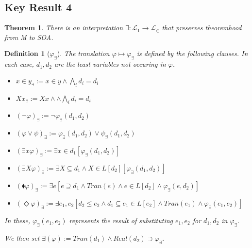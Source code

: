 \documentclass{article}
\newcommand\D{\blacklozenge}
\newtheorem{definition}{Definition}
\newtheorem{theorem}{Theorem}
\begin{document}
\subsection{Key Result 4}
\begin{theorem} 
    There is an interpretation $\exists : \mathcal{L}_1 \to \mathcal{L}_\in$ that preserves 
    theoremhood from M to SOA.
    \end{theorem}
    \begin{definition}[$\varphi_\exists$]
        The translation $\varphi \mapsto \varphi_\exists$ is defined by the following clauses.
        In each case, $d_1, d_2$ are the least variables not occuring in $\varphi$.
        \begin{itemize}
            \item $x \in y_\exists := x \in y \wedge \bigwedge_i d_i = d_i$
            \item $Xx_\exists := Xx \wedge \wedge \bigwedge_i d_i = d_i$
            \item $(\neg \varphi)_\exists := \neg \varphi_\exists(d_1, d_2)$
            \item $(\varphi \vee \psi)_\exists := \varphi_\exists(d_1, d_2) \vee \psi_\exists(d_1, d_2)$
            \item $(\exists x \varphi)_\exists := \exists x \in d_1[ \varphi_\exists(d_1, d_2)]$
            \item $(\exists X \varphi)_\exists := \exists X \subseteq d_1 \wedge X \in L[d_2] [ \varphi_\exists(d_1, d_2)]$
            \item $(\D \varphi)_\exists := \exists e[e \supseteq d_1 \wedge Tran(e) \wedge e \in L[d_2] \wedge \varphi_\exists(e, d_2)]$
            \item $(\Diamond \varphi)_\exists := \exists e_1, e_2[d_2 \leq e_2 \wedge d_1 \subseteq e_1 \in L[e_2] \wedge Tran(e_1) \wedge \varphi_\exists(e_1, e_2)]$
        \end{itemize}
        In these, $\varphi_\exists(e_1, e_2)$ represents the result of substituting $e_1, e_2$ for $d_1, d_2$ in
        $\varphi_\exists$.
    
        We then set $\exists(\varphi) := Tran(d_1) \wedge Real(d_2) \supset \varphi_\exists$.
    \end{definition}
\end{document}
